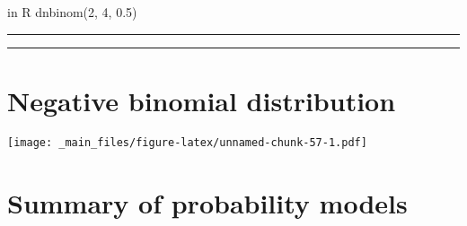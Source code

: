 \documentclass[
]{book}
\begin{document}
in R dnbinom(2, 4, 0.5)

\begin{center}\rule{0.5\linewidth}{0.5pt}\end{center}

\begin{center}\rule{0.5\linewidth}{0.5pt}\end{center}

\hypertarget{negative-binomial-distribution-3}{%
\section{Negative binomial distribution}\label{negative-binomial-distribution-3}}

\texttt{[image: \_main\_files/figure-latex/unnamed-chunk-57-1.pdf]}

\hypertarget{summary-of-probability-models}{%
\section{Summary of probability models}\label{summary-of-probability-models}}
\end{document}
